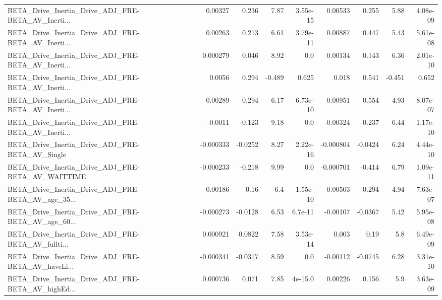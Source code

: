 \begin{tabular}{lrrrrrrrr}
BETA\_Drive\_Inertia\_Drive\_ADJ\_FRE-BETA\_AV\_Inerti... &     0.00327 &        0.236 &     7.87 & 3.55e-15 &    0.00533 &       0.255 &         5.88 &      4.08e-09 \\
BETA\_Drive\_Inertia\_Drive\_ADJ\_FRE-BETA\_AV\_Inerti... &     0.00263 &        0.213 &     6.61 & 3.79e-11 &    0.00887 &       0.447 &         5.43 &      5.61e-08 \\
BETA\_Drive\_Inertia\_Drive\_ADJ\_FRE-BETA\_AV\_Inerti... &    0.000279 &        0.046 &     8.92 &      0.0 &    0.00134 &       0.143 &         6.36 &      2.01e-10 \\
BETA\_Drive\_Inertia\_Drive\_ADJ\_FRE-BETA\_AV\_Inerti... &      0.0056 &        0.294 &   -0.489 &    0.625 &      0.018 &       0.541 &       -0.451 &         0.652 \\
BETA\_Drive\_Inertia\_Drive\_ADJ\_FRE-BETA\_AV\_Inerti... &     0.00289 &        0.294 &     6.17 & 6.73e-10 &    0.00951 &       0.554 &         4.93 &      8.07e-07 \\
BETA\_Drive\_Inertia\_Drive\_ADJ\_FRE-BETA\_AV\_Inerti... &     -0.0011 &       -0.123 &     9.18 &      0.0 &   -0.00324 &      -0.237 &         6.44 &      1.17e-10 \\
BETA\_Drive\_Inertia\_Drive\_ADJ\_FRE-BETA\_AV\_Single    &   -0.000333 &      -0.0252 &     8.27 & 2.22e-16 &  -0.000804 &     -0.0424 &         6.24 &      4.44e-10 \\
BETA\_Drive\_Inertia\_Drive\_ADJ\_FRE-BETA\_AV\_WAITTIME  &   -0.000233 &       -0.218 &     9.99 &      0.0 &  -0.000701 &      -0.414 &         6.79 &      1.09e-11 \\
BETA\_Drive\_Inertia\_Drive\_ADJ\_FRE-BETA\_AV\_age\_35... &     0.00186 &         0.16 &      6.4 & 1.55e-10 &    0.00503 &       0.294 &         4.94 &      7.63e-07 \\
BETA\_Drive\_Inertia\_Drive\_ADJ\_FRE-BETA\_AV\_age\_60... &   -0.000273 &      -0.0128 &     6.53 &  6.7e-11 &   -0.00107 &     -0.0367 &         5.42 &      5.95e-08 \\
BETA\_Drive\_Inertia\_Drive\_ADJ\_FRE-BETA\_AV\_fullti... &    0.000921 &       0.0822 &     7.58 & 3.53e-14 &      0.003 &        0.19 &          5.8 &      6.49e-09 \\
BETA\_Drive\_Inertia\_Drive\_ADJ\_FRE-BETA\_AV\_haveLi... &   -0.000341 &      -0.0317 &     8.59 &      0.0 &   -0.00112 &     -0.0745 &         6.28 &      3.31e-10 \\
BETA\_Drive\_Inertia\_Drive\_ADJ\_FRE-BETA\_AV\_highEd... &    0.000736 &        0.071 &     7.85 &  4e-15.0 &    0.00226 &       0.156 &          5.9 &      3.63e-09 \\

\end{tabular}
